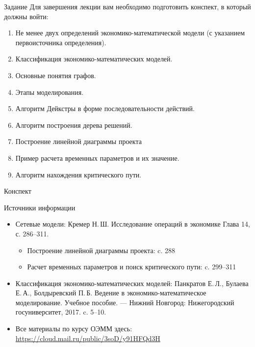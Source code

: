 \documentclass[unicode,11pt,notheorems]{beamer}
\begin{document}
\begin{frame}{Задание}
Для завершения лекции вам необходимо подготовить конспект, в который должны войти:
	\begin{enumerate}
		\item 
			 Не менее двух определений экономико-математической модели (с указанием первоисточника определения).
		\item 
			 Классификация экономико-математических моделей.
		\item 
			 Основные понятия графов.
		\item 
			  Этапы моделирования.
		\item 
			 Алгоритм Дейкстры в форме последовательности действий.
		\item 
			 Алгоритм построения дерева решений.
		\item 
			 Построение линейной диаграммы проекта 
		\item 
			 Пример расчета временных параметров и их значение.
		\item 
			 Алгоритм нахождения критического пути.
	\end{enumerate}

Конспект

\end{frame}
\begin{frame}{Источники информации}
\begin{itemize}
\item 
	Сетевые модели:  Кремер  Н.\,Ш. Исследование операций в экономике Глава 14, с. 286--311.
	\begin{itemize}
		\item  
			Построение линейной диаграммы проекта: c. 288
		\item 
			 Расчет временных параметров и поиск критического пути:  c. 299--311
	\end{itemize}
\item 
	Классификация экономико-математических моделей: 	
	Панкратов Е.\,Л., Булаева Е.\,А., Болдыревский П.\,Б. Ведение в экономико-математическое моделирование. Учебное пособие. --- Нижний Новгород: Нижегородский госуниверситет, 2017.  c. 5--10.
\bigskip
\item 
	Все материалы по курсу ОЭММ здесь:
{\color{blue}\url{https://cloud.mail.ru/public/3soD/y91HFQd3H}}

\end{itemize}

\end{frame}
\end{document}
